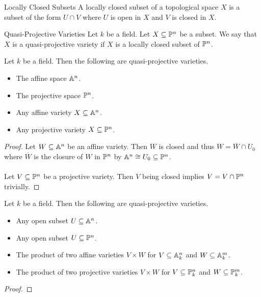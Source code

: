 \documentclass[a4paper]{article}
\begin{document}
\begin{defn}{Locally Closed Subsets}{} A locally closed subset of a topological space $X$ is a subset of the form $U\cap V$ where $U$ is open in $X$ and $V$ is closed in $X$. 
\end{defn}

\begin{defn}{Quasi-Projective Varieties}{} Let $k$ be a field. Let $X\subseteq\mathbb{P}^n$ be a subset. We say that $X$ is a quasi-projective variety if $X$ is a locally closed subset of $\mathbb{P}^n$. 
\end{defn}

\begin{prp}{}{} Let $k$ be a field. Then the following are quasi-projective varieties. 
\begin{itemize}
\item The affine space $\mathbb{A}^n$. 
\item The projective space $\mathbb{P}^n$. 
\item Any affine variety $X\subseteq\mathbb{A}^n$. 
\item Any projective variety $X\subseteq\mathbb{P}^n$. 
\end{itemize} \tcbline
\begin{proof}
Let $W\subseteq\mathbb{A}^n$ be an affine variety. Then $W$ is closed and thus $W=\overline{W}\cap U_0$ where $\overline{W}$ is the closure of $W$ in $\mathbb{P}^n$ by $\mathbb{A}^n\cong U_0\subseteq\mathbb{P}^n$. \\~\\
Let $V\subseteq\mathbb{P}^n$ be a projective variety. Then $V$ being closed implies $V=V\cap\mathbb{P}^n$ trivially. 
\end{proof}
\end{prp}

\begin{prp}{}{} Let $k$ be a field. Then the following are quasi-projective varieties. 
\begin{itemize}
\item Any open subset $U\subseteq\mathbb{A}^n$. 
\item Any open subset $U\subseteq\mathbb{P}^n$. 
\item The product of two affine varieties $V\times W$ for $V\subseteq\mathbb{A}_k^n$ and $W\subseteq\mathbb{A}_k^m$. 
\item The product of two projective varieties $V\times W$ for $V\subseteq\mathbb{P}_k^n$ and $W\subseteq\mathbb{P}_k^m$. 
\end{itemize} \tcbline
\begin{proof}
\end{proof}
\end{prp}
\end{document}
